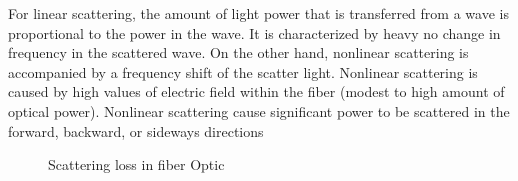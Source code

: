 \documentclass[12pt]{report}
\begin{document}
	For linear scattering, the amount of light power that is transferred from a wave is proportional to the power in the wave. It is characterized by heavy no change in frequency in the scattered wave. On the other hand, nonlinear scattering is accompanied by a frequency shift of the scatter light. Nonlinear scattering is caused by high values of electric field within the fiber (modest to high amount of optical power). Nonlinear scattering cause significant power to be scattered in the forward, backward, or sideways directions
	
		\begin{figure}[htbp]
		\caption{Scattering loss in fiber Optic}
		\label{fig:scttering_loss}
	\end{figure}
\end{document}
